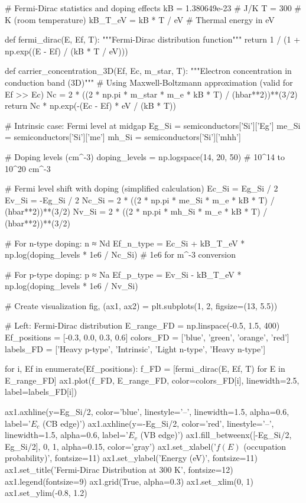 \documentclass[11pt,a4paper]{article}
\begin{document}
\begin{pycode}
# Fermi-Dirac statistics and doping effects
kB = 1.380649e-23  # J/K
T = 300  # K (room temperature)
kB_T_eV = kB * T / eV  # Thermal energy in eV

def fermi_dirac(E, Ef, T):
    """Fermi-Dirac distribution function"""
    return 1 / (1 + np.exp((E - Ef) / (kB * T / eV)))

def carrier_concentration_3D(Ef, Ec, m_star, T):
    """Electron concentration in conduction band (3D)"""
    # Using Maxwell-Boltzmann approximation (valid for Ef >> Ec)
    Nc = 2 * ((2 * np.pi * m_star * m_e * kB * T) / (hbar**2))**(3/2)
    return Nc * np.exp(-(Ec - Ef) * eV / (kB * T))

# Intrinsic case: Fermi level at midgap
Eg_Si = semiconductors['Si']['Eg']
me_Si = semiconductors['Si']['me']
mh_Si = semiconductors['Si']['mhh']

# Doping levels (cm^-3)
doping_levels = np.logspace(14, 20, 50)  # 10^14 to 10^20 cm^-3

# Fermi level shift with doping (simplified calculation)
Ec_Si = Eg_Si / 2
Ev_Si = -Eg_Si / 2
Nc_Si = 2 * ((2 * np.pi * me_Si * m_e * kB * T) / (hbar**2))**(3/2)
Nv_Si = 2 * ((2 * np.pi * mh_Si * m_e * kB * T) / (hbar**2))**(3/2)

# For n-type doping: n ≈ Nd
Ef_n_type = Ec_Si + kB_T_eV * np.log(doping_levels * 1e6 / Nc_Si)  # 1e6 for m^-3 conversion

# For p-type doping: p ≈ Na
Ef_p_type = Ev_Si - kB_T_eV * np.log(doping_levels * 1e6 / Nv_Si)

# Create visualization
fig, (ax1, ax2) = plt.subplots(1, 2, figsize=(13, 5.5))

# Left: Fermi-Dirac distribution
E_range_FD = np.linspace(-0.5, 1.5, 400)
Ef_positions = [-0.3, 0.0, 0.3, 0.6]
colors_FD = ['blue', 'green', 'orange', 'red']
labels_FD = ['Heavy p-type', 'Intrinsic', 'Light n-type', 'Heavy n-type']

for i, Ef in enumerate(Ef_positions):
    f_FD = [fermi_dirac(E, Ef, T) for E in E_range_FD]
    ax1.plot(f_FD, E_range_FD, color=colors_FD[i], linewidth=2.5, label=labels_FD[i])

ax1.axhline(y=Eg_Si/2, color='blue', linestyle='--', linewidth=1.5, alpha=0.6, label='$E_c$ (CB edge)')
ax1.axhline(y=-Eg_Si/2, color='red', linestyle='--', linewidth=1.5, alpha=0.6, label='$E_v$ (VB edge)')
ax1.fill_betweenx([-Eg_Si/2, Eg_Si/2], 0, 1, alpha=0.15, color='gray')
ax1.set_xlabel('$f(E)$ (occupation probability)', fontsize=11)
ax1.set_ylabel('Energy (eV)', fontsize=11)
ax1.set_title('Fermi-Dirac Distribution at 300 K', fontsize=12)
ax1.legend(fontsize=9)
ax1.grid(True, alpha=0.3)
ax1.set_xlim(0, 1)
ax1.set_ylim(-0.8, 1.2)


\end{pycode}
\end{document}
